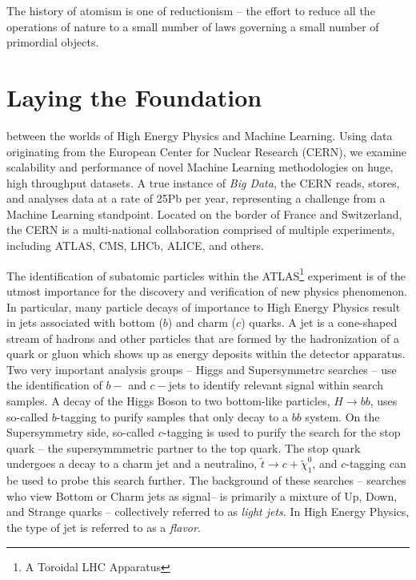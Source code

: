 \begin{savequote}[75mm] 
The history of atomism is one of reductionism – the effort to reduce all the operations of nature to a small number of laws governing a small number of primordial objects.
\end{savequote}

\chapter{Laying the Foundation}


 between the worlds of High Energy Physics and Machine Learning. Using data originating from the European Center for Nuclear Research (CERN), we examine scalability and performance of novel Machine Learning methodologies on huge, high throughput datasets. A true instance of \textit{Big Data}, the CERN reads, stores, and analyses data at a rate of 25Pb per year, representing a challenge from a Machine Learning standpoint. Located on the border of France and Switzerland, the CERN is a multi-national collaboration comprised of multiple experiments, including ATLAS, CMS, LHCb, ALICE, and others.

The identification of subatomic particles within the ATLAS\footnote{A Toroidal LHC Apparatus} experiment is of the utmost importance for the discovery and verification of new physics phenomenon. In particular, many particle decays of importance to High Energy Physics result in jets associated with bottom ($b$) and charm ($c$) quarks. A jet is a cone-shaped stream of hadrons and other particles that are formed by the hadronization of a quark or gluon which shows up as energy deposits within the detector apparatus. Two very important analysis groups -- Higgs and Supersymmetrc searches -- use the identification of $b-$ and $c-$jets to identify relevant signal within search samples. A decay of the Higgs Boson to two bottom-like particles, $H \longrightarrow bb$, uses so-called $b$-tagging to purify samples that only decay to a $bb$ system. On the Supersymmetry side, so-called $c$-tagging is used to purify the search for the stop quark -- the supersymmmetric partner to the top quark. The stop quark undergoes a decay to a charm jet and a neutralino, $\tilde{t}\longrightarrow c + \tilde{\chi}_{1}^{0}$, and $c$-tagging can be used to probe this search further. The background of these searches -- searches who view Bottom or Charm jets as signal-- is primarily a mixture of Up, Down, and Strange quarks -- collectively referred to as \textit{light jets}. In High Energy Physics, the type of jet is referred to as a \emph{flavor}.

